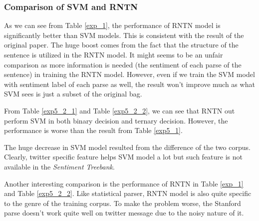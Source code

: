 \subsubsection{Comparison of SVM and RNTN}
As we can see from Table \ref{exp_1}, the performance of RNTN model is significantly better than SVM models. This is consistent with the result of the original paper\cite{Socher:2013}. The huge boost comes from the fact that the structure of the sentence is utilized in the RNTN model. It might seems to be an unfair comparison as more information is needed (the sentiment of each parse of the sentence) in training the RNTN model. 
However, even if we train the SVM model with sentiment label of each parse as well, the result won't improve much as what SVM sees is just a subset of the original bag.  

From Table \ref{exp5_2_1} and Table \ref{exp5_2_2}, we can see that RNTN out perform SVM in both binary decision and ternary decision. However, the performance is worse than the result from Table \ref{exp5_1}. 

The huge decrease in SVM model resulted from the difference of the two corpus. 
Clearly, twitter specific feature helps SVM model a lot but such feature is not available in the \textit{Sentiment Treebank}. 

Another interesting comparison is the performance of RNTN in Table \ref{exp_1} and Table \ref{exp5_2_2}. Like statistical parser, RNTN model is also quite specific to the genre of the training corpus. To make the problem worse, the Stanford parse doesn't work quite well on twitter message due to the noisy nature of it. 




